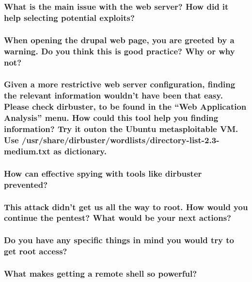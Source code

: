 \subsubsection{What is the main issue with the web server? How did it help selecting potential exploits?}
\subsubsection{When opening the drupal web page, you are greeted by a warning. Do you think this is good practice? Why or why not?}
\subsubsection{Given a more restrictive web server configuration, finding the relevant information wouldn't have been that easy. Please check dirbuster, to be found in the “Web Application Analysis” menu. How could this tool help you finding information? Try it outon the Ubuntu metasploitable VM. Use /usr/share/dirbuster/wordlists/directory-list-2.3-medium.txt as dictionary.}
\subsubsection{How can effective spying with tools like dirbuster prevented?}
\subsubsection{This attack didn't get us all the way to root. How would you continue the pentest? What would be your next actions?}
\subsubsection{Do you have any specific things in mind you would try to get root access?}
\subsubsection{What makes getting a remote shell so powerful?}